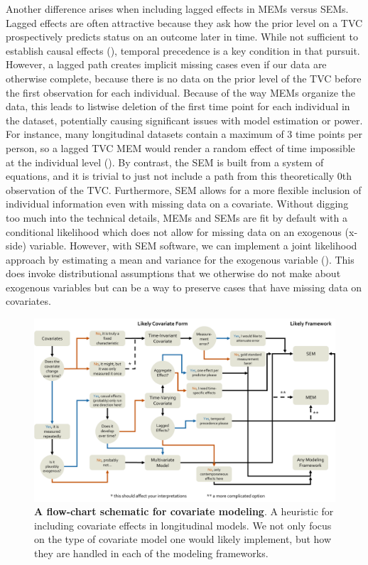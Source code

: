 \documentclass[11pt]{article}
\begin{document}
Another difference arises when including lagged effects in MEMs versus SEMs. Lagged effects are often attractive because they ask how the prior level on a TVC prospectively predicts status on an outcome later in time. While not sufficient to establish causal effects (\cite{rohrer_these_2021,shadish_experimental_2002}), temporal precedence is a key condition in that pursuit. However, a lagged path creates implicit missing cases even if our data are otherwise complete, because there is no data on the prior level of the TVC before the first observation for each individual. Because of the way MEMs organize the data, this leads to listwise deletion of the first time point for each individual in the dataset, potentially causing significant issues with model estimation or power. For instance, many longitudinal datasets contain a maximum of 3 time points per person, so a lagged TVC MEM would render a random effect of time impossible at the individual level (\cite{mcneish_flexible_2020}). By contrast, the SEM is built from a system of equations, and it is trivial to just not include a path from this theoretically 0th observation of the TVC. Furthermore, SEM allows for a more flexible inclusion of individual information even with missing data on a covariate. Without digging too much into the technical details, MEMs and SEMs are fit by default with a conditional likelihood which does not allow for missing data on an exogenous (x-side) variable. However, with SEM software, we can implement a joint likelihood approach by estimating a mean and variance for the exogenous variable (\cite{bauer_estimating_2003,mcneish_flexible_2020}). This does invoke distributional assumptions that we otherwise do not make about exogenous variables but can be a way to preserve cases that have missing data on covariates.

\begin{figure}[H]
    \centering
    \includegraphics[width = 1\textwidth]{figures/Figure 3.pdf}
    \caption{\textbf{A flow-chart schematic for covariate modeling}. A heuristic for including covariate effects in longitudinal models. We not only focus on the type of covariate model one would likely implement, but how they are handled in each of the modeling frameworks.}
    \label{fig:covarFig}
\end{figure}
\end{document}
